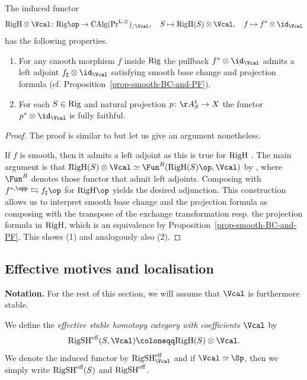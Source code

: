 \documentclass[colorinlistoftodos,article,11pt,reqno]{article}
\newcommand{\RigSH}{\textup{RigSH}}
\newcommand{\RigH}{\textup{RigH}}
\newcommand{\Rig}{\textup{Rig}}
\newcommand{\eff}{\textup{eff}}
\newcommand{\Arig}{\AA^{1}}
\renewcommand{\to}[1][]{\overset{#1}{\rightarrow}}
\newcommand{\PrLO}{\textup{Pr}^{\textup{L},\otimes}}
\newcommand{\CAlgPr}{\textup{CAlg}(\PrLO)}
\begin{document}
\begin{lem}
\label{lem-effective-coeff}
	 The induced functor 
        $$
        \RigH\otimes \Vcal \colon\Rig\op\to \CAlgPr_{/\Vcal},\quad S\mapsto \RigH(S)\otimes \Vcal,\quad f\mapsto f^{*}\otimes\id_{\Vcal}
        $$ 
        has the following properties.
	\begin{enumerate}
		\item[(1)] For any smooth morphism $f$ inside $\Rig$ the pullback $f^{*}\otimes \id_{\Vcal}$ admits a left adjoint $f_{\sharp}\otimes \id_{\Vcal}$ satisfying smooth base change and projection formula (cf. Proposition~\ref{prop-smooth-BC-and-PF}). 
		\item[(2)] For each $S\in\Rig$ and natural projection $p\colon \Arig_{S}\rightarrow X$ the functor $p^{*}\otimes \id_{\Vcal}$ is fully faithful.
	\end{enumerate}
\end{lem}
\begin{proof}
The proof is similar to \cite[Prop. 8.5]{DrewMHM} but let us give an argument nonetheless.\par
	If $f$ is smooth, then it admits a left adjoint as this is true for $\RigH$ \cite[Lem. 8.4]{DrewMHM}. The main argument is that $\RigH(S)\otimes\Vcal\simeq \Fun^{R}(\RigH(S)\op,\Vcal)$ by \cite[Prop 4.8.1.17]{HA}, where $\Fun^{R}$ denotes those functor that admit left adjoints. Composing with $f^{*,\opp}\leftrightarrows f_{\sharp}\op$ for $\RigH\op$ yields the desired adjunction. This construction allows us to interpret smooth base change and the projection formula as composing with the transpose of the exchange transformation resp. the projection formula in $\RigH$, which is an equivalence by Proposition~\ref{prop-smooth-BC-and-PF}. This shows (1) and analogously also (2). %
\end{proof}




\subsection{Effective motives and localisation}

\vspace{6pt}\noindent\textbf{Notation.} 
For the rest of this section, we will assume that $\Vcal$ is furthermore stable.

\begin{defi}
	We define the \textit{effective stable homotopy category with coefficients $\Vcal$} by 
	\[
		\RigSH^{\eff}(S,\Vcal)\coloneqq\RigH(S)\otimes \Vcal.
	\]
	We denote the induced functor by $\RigSH^{\eff}_{\Vcal}$ and if $\Vcal\simeq \Sp$, then we simply write $\RigSH^\eff(S)$ and $\RigSH^{\eff}$. 
\end{defi}
\end{document}

